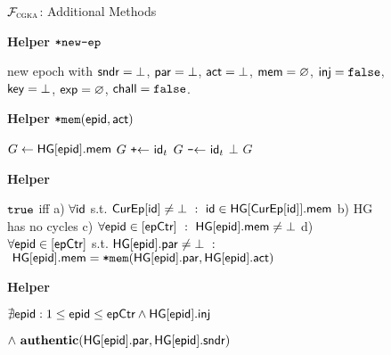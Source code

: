\begin{figure*}[tbp]
  \begin{systembox}{$\mathcal{F}_{\normalfont\textsc{cgka}}$: Additional Methods}
     {\begin{minipage}[t]{0.47\linewidth}

    {\bf Helper ${\textnormal{\tt*new-ep}}$}
    \begin{algorithmic}
      \State \Return new epoch with $\mathsf{sndr}=\bot$, $\mathsf{par}=\bot$, $\mathsf{act}=\bot$, $\mathsf{mem}=\varnothing$, $\textsf{inj}={\normalfont\texttt{false}}$, $\mathsf{key}=\bot$, $\mathsf{exp}=\varnothing$, $\mathsf{chall}={\normalfont\texttt{false}}$.
    \end{algorithmic}

    \medskip
    {\bf Helper ${\textnormal{\tt*mem}}({\normalfont\textsf{epid}},\mathsf{act})$}
    \begin{algorithmic}
      \State $G \gets \mathsf{HG}[{\normalfont\textsf{epid}}].\mathsf{mem} $
        \State $G \ \texttt{+$\gets$}\  {\mathsf{id}}_t$
        \State $G \ \texttt{-$\gets$}\  {\mathsf{id}}_t$
      \EndIf
        \State \Return $\bot$
      \EndIf
      \State \Return $G$
    \end{algorithmic}
  \end{minipage}}\hfill
  {\begin{minipage}[t]{0.49\linewidth}

    {\bf Helper \hgConsistent}
    \begin{algorithmic}
      \State \vspace*{-.6em} 
      \State \Return ${\normalfont\texttt{true}}$ iff
      \State \hspace*{1.5em} a) $\forall {\ensuremath{\mathsf{id}}}$ s.t. $\textsf{CurEp}[{\mathsf{id}}] \neq \bot \ : \ {\mathsf{id}} \in \mathsf{HG}[\textsf{CurEp}[{\mathsf{id}}]].\mathsf{mem}$
      \State \hspace*{1.5em} b) HG has no cycles
      \State \hspace*{1.5em} c) $\forall \hgnodeid \in [\hgnctr]\ :\ \setvert[\hgnodeid].\hgm\neq\bot$
      \State \hspace*{1.5em} d) $\forall {\normalfont\textsf{epid}} \in [\textsf{epCtr}]$ s.t. $\mathsf{HG}[{\normalfont\textsf{epid}}].\mathsf{par}\neq\bot\ :$\\\hspace*{4em} $\ \mathsf{HG}[{\normalfont\textsf{epid}}].\mathsf{mem} = {\textnormal{\tt*mem}}(\mathsf{HG}[{\normalfont\textsf{epid}}].\mathsf{par},\mathsf{HG}[{\normalfont\textsf{epid}}].\mathsf{act})$
    \end{algorithmic}

    \medskip
    {\bf Helper \authPreserved}
    \begin{algorithmic}
      \State \vspace*{-.6em}
      \State \Return $\nexists{\normalfont\textsf{epid}} :  1 \leq {\normalfont\textsf{epid}} \leq \textsf{epCtr} \land \mathsf{HG}[{\normalfont\textsf{epid}}].\textsf{inj}$ \\\strut\hfill $ \land\ \textnormal{\textbf{authentic}}(\mathsf{HG}[{\normalfont\textsf{epid}}].\mathsf{par}, \mathsf{HG}[{\normalfont\textsf{epid}}].\mathsf{sndr})$
    \end{algorithmic}


\end{minipage}}
\end{systembox}
\end{figure*}
